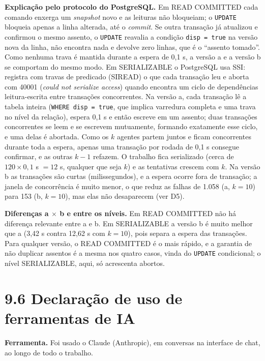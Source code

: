 \documentclass[11pt,a4paper]{article}
\newcommand{\tp}[1]{\texttt{#1}}
\begin{document}
\textbf{Explicação pelo protocolo do PostgreSQL.} Em READ COMMITTED cada comando enxerga um \emph{snapshot} novo e as leituras não bloqueiam; o \tp{UPDATE} bloqueia apenas a linha alterada, até o \emph{commit}. Se outra transação já atualizou e confirmou o mesmo assento, o \tp{UPDATE} reavalia a condição \tp{disp = true} na versão nova da linha, não encontra nada e devolve zero linhas, que é o ``assento tomado''. Como nenhuma trava é mantida durante a espera de 0,1 s, a versão a e a versão b se comportam do mesmo modo. Em SERIALIZABLE o PostgreSQL usa SSI: registra com travas de predicado (SIREAD) o que cada transação leu e aborta com 40001 (\emph{could not serialize access}) quando encontra um ciclo de dependências leitura-escrita entre transações concorrentes. Na versão a, cada transação lê a tabela inteira (\tp{WHERE disp = true}, que implica varredura completa e uma trava no nível da relação), espera 0,1 s e então escreve em um assento; duas transações concorrentes se leem e se escrevem mutuamente, formando exatamente esse ciclo, e uma delas é abortada. Como os $k$ agentes partem juntos e ficam concorrentes durante toda a espera, apenas uma transação por rodada de 0,1 s consegue confirmar, e as outras $k-1$ refazem. O trabalho fica serializado (cerca de $120 \times 0{,}1$ s $= 12$ s, qualquer que seja $k$) e as tentativas crescem com $k$. Na versão b as transações são curtas (milissegundos), e a espera ocorre fora de transação; a janela de concorrência é muito menor, o que reduz as falhas de 1.058 (a, $k=10$) para 153 (b, $k=10$), mas elas não desaparecem (ver D5).

\textbf{Diferenças a $\times$ b e entre os níveis.} Em READ COMMITTED não há diferença relevante entre a e b. Em SERIALIZABLE a versão b é muito melhor que a (3,42 s contra 12,62 s com $k=10$), pois separa a espera das transações. Para qualquer versão, o READ COMMITTED é o mais rápido, e a garantia de não duplicar assentos é a mesma nos quatro casos, vinda do \tp{UPDATE} condicional; o nível SERIALIZABLE, aqui, só acrescenta abortos.

\section*{9.6 Declaração de uso de ferramentas de IA}
\textbf{Ferramenta.} Foi usado o Claude (Anthropic), em conversas na interface de chat, ao longo de todo o trabalho.
\end{document}
